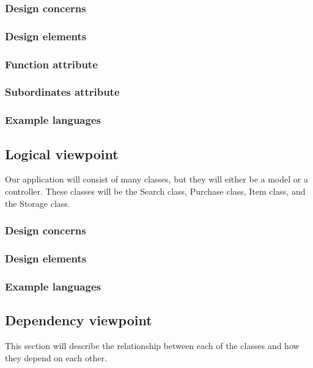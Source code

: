 \documentclass[journal,compsoc, 10pt, draftclsnofoot, onecolumn]{IEEEtran}
\begin{document}
\subsubsection*{Design concerns}

\subsubsection*{Design elements}

\subsubsection*{Function attribute}

\subsubsection*{Subordinates attribute}

\subsubsection*{Example languages}

\subsection{Logical viewpoint}
Our application will consist of many classes, but they will either be a model or 
a controller. These classes will be the Search class, Purchase class, Item class, 
and the Storage class.

\subsubsection*{Design concerns}

\subsubsection*{Design elements}

\subsubsection*{Example languages}

\subsection{Dependency viewpoint}
This section will describe the relationship between each of the classes and how 
they depend on each other. 
\end{document}
